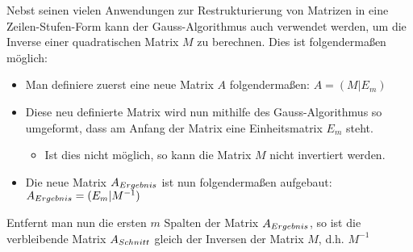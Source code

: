 Nebst seinen vielen Anwendungen zur Restrukturierung von Matrizen in eine Zeilen-Stufen-Form kann der Gauss-Algorithmus auch verwendet werden, um die Inverse einer quadratischen Matrix $M$ zu berechnen.
Dies ist folgendermaßen möglich:

\begin{itemize}
\item Man definiere zuerst eine neue Matrix $A$ folgendermaßen:
$A = (M|E_m)$
\item Diese neu definierte Matrix wird nun mithilfe des Gauss-Algorithmus so umgeformt, dass am Anfang der Matrix eine Einheitsmatrix $E_m$ steht.
\begin{itemize}
\item Ist dies nicht möglich, so kann die Matrix $M$ nicht invertiert werden.
\end{itemize}
\item Die neue Matrix $A_{\tiny Ergebnis}$ ist nun folgendermaßen aufgebaut: $A_{\tiny Ergebnis} = (E_m|M^{-1})$
\end{itemize}
Entfernt man nun die ersten $m$ Spalten der Matrix $A_{\tiny Ergebnis}$, so ist die verbleibende Matrix $A_{\tiny Schnitt}$ gleich der Inversen der Matrix $M$, d.h. $M^{-1}$

\begin{Bew}

\end{Bew}